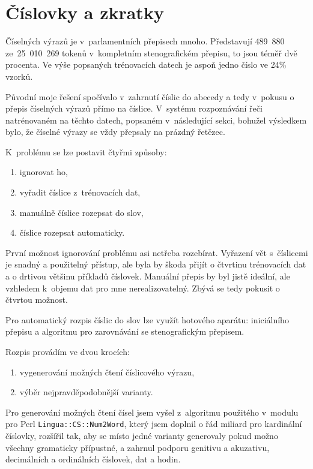 \section{Číslovky a zkratky}
\label{sec:svolocz:cislovky}

Číselných výrazů je v~parlamentních přepisech mnoho. Představují 489~880
ze~25~010~269 tokenů v~kompletním stenografickém přepisu, to jsou téměř dvě
procenta. Ve výše popsaných trénovacích datech je aspoň jedno číslo ve 24\%
vzorků.

Původní moje řešení spočívalo v~zahrnutí číslic do abecedy a tedy
v~pokusu o přepis číselných výrazů přímo na číslice. V~systému rozpoznávání řeči
natrénovaném na těchto datech, popsaném v~následující sekci, bohužel výsledkem bylo, že
číselné výrazy se vždy přepsaly na prázdný řetězec.

K~problému se lze postavit čtyřmi způsoby:
\begin{enumerate}
\item{ignorovat ho,}
\item{vyřadit číslice z~trénovacích dat,}
\item{manuálně číslice rozepsat do slov,}
\item{číslice rozepsat automaticky.}
\end{enumerate}

První možnost ignorování problému asi netřeba rozebírat.
Vyřazení vět s~číslicemi je snadný a použitelný přístup, ale byla by škoda
přijít o čtvrtinu trénovacích dat a o drtivou většinu příkladů číslovek.
Manuální přepis by byl jistě ideální, ale vzhledem k~objemu dat pro mne
nerealizovatelný. Zbývá se tedy pokusit o čtvrtou možnost.

Pro automatický rozpis číslic do slov lze využít hotového aparátu: iniciálního
přepisu a algoritmu pro zarovnávání se stenografickým přepisem.

Rozpis provádím ve dvou krocích:
\begin{enumerate}
\item{vygenerování možných čtení číslicového výrazu,}
\item{výběr nejpravděpodobnější varianty.}
\end{enumerate}

Pro generování možných čtení čísel jsem vyšel z~algoritmu použitého v~modulu pro
Perl \texttt{Lingua::CS::Num2Word}, který jsem doplnil o řád miliard pro
kardinální číslovky, rozšířil tak, aby se místo jedné varianty generovaly
pokud možno všechny gramaticky přípustné, a zahrnul podporu genitivu a
akuzativu, decimálních a ordinálních číslovek, dat a hodin.

